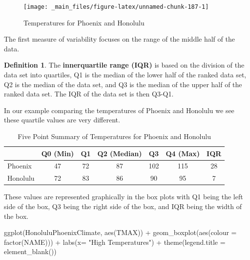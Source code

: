\documentclass[
]{book}
\newenvironment{Shaded}{\begin{snugshade}}{\end{snugshade}}
\newcommand{\AttributeTok}[1]{\textcolor[rgb]{0.77,0.63,0.00}{#1}}
\newcommand{\FunctionTok}[1]{\textcolor[rgb]{0.00,0.00,0.00}{#1}}
\newcommand{\NormalTok}[1]{#1}
\newcommand{\SpecialCharTok}[1]{\textcolor[rgb]{0.00,0.00,0.00}{#1}}
\newcommand{\StringTok}[1]{\textcolor[rgb]{0.31,0.60,0.02}{#1}}
\theoremstyle{definition}
\newtheorem{definition}{Definition}[chapter]
\theoremstyle{definition}
\theoremstyle{definition}
\theoremstyle{definition}
\theoremstyle{remark}
\begin{document}
\begin{figure}

{\centering \texttt{[image: \_main\_files/figure-latex/unnamed-chunk-187-1]} 

}

\caption{Temperatures for Phoenix and Honolulu}\label{fig:unnamed-chunk-187}
\end{figure}

The first measure of variability focuses on the range of the middle half of the data.

\begin{definition}
The \textbf{innerquartile range (IQR)} is based on the division of the data set into quartiles, Q1 is the median of the lower half of the ranked data set, Q2 is the median of the data set, and Q3 is the median of the upper half of the ranked data set. The IQR of the data set is then Q3-Q1.
\end{definition}

In our example comparing the temperatures of Phoenix and Honolulu we see these quartile values are very different.

\begin{table}

\caption{\label{tab:unnamed-chunk-189}Five Point Summary of Temperatures for Phoenix and Honolulu}
\centering
\begin{tabular}[t]{lcccccc}
\toprule
  & Q0 (Min) & Q1 & Q2 (Median) & Q3 & Q4 (Max) & IQR\\
\midrule
Phoenix & 47 & 72 & 87 & 102 & 115 & 28\\
Honolulu & 72 & 83 & 86 & 90 & 95 & 7\\
\bottomrule
\end{tabular}
\end{table}

These values are represented graphically in the box plots with Q1 being the left side of the box, Q3 being the right side of the box, and IQR being the width of the box.

\begin{Shaded}
\begin{Highlighting}[]
\FunctionTok{ggplot}\NormalTok{(HonoluluPhoenixClimate, }\FunctionTok{aes}\NormalTok{(TMAX)) }\SpecialCharTok{+} \FunctionTok{geom\_boxplot}\NormalTok{(}\FunctionTok{aes}\NormalTok{(}\AttributeTok{colour =} \FunctionTok{factor}\NormalTok{(NAME))) }\SpecialCharTok{+} \FunctionTok{labs}\NormalTok{(}\AttributeTok{x=} \StringTok{"High Temperatures"}\NormalTok{) }\SpecialCharTok{+} \FunctionTok{theme}\NormalTok{(}\AttributeTok{legend.title =} \FunctionTok{element\_blank}\NormalTok{())}
\end{Highlighting}
\end{Shaded}
\end{document}
